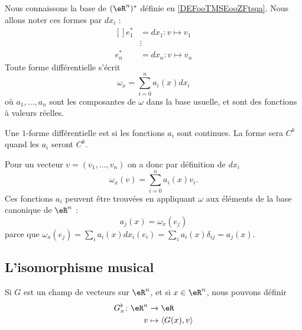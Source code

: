 Nous connaissons la base de \( (\eR^n)^*\) définie en \ref{DEFooTMSEooZFtsqa}. Nous allons noter ces formes par \( dx_i\) :
\begin{equation}        \label{EQooITHKooDzigPY}
	\begin{aligned}[]
		e^*_1 & =dx_1\colon v\mapsto v_1 \\
		      & \vdots                   \\
		e^*_n & =dx_n\colon v\mapsto v_n
	\end{aligned}
\end{equation}
Toute forme différentielle s'écrit
\begin{equation}
	\omega_x = \sum_{i=0}^n a_i(x) d x_i
\end{equation}
où \( a_1,\ldots,a_n\) sont les composantes de \( \omega\) dans la base usuelle, et sont des fonctions à valeurs réelles.

\begin{lemma}		\label{LEMooNSFKooLOKGGy}
	Une \( 1\)-forme différentielle est  si les fonctions \( a_i\) sont continues. La forme sera \( C^k\) quand les \( a_i\) seront \( C^k\).
\end{lemma}

Pour un vecteur \( v = (v_1,\ldots,v_n)\) on a donc par définition de \( d x_i\)
\begin{equation}
	\omega_x (v) = \sum_{i=0}^n a_i(x) v_i.
\end{equation}
Ces fonctions \( a_i\) peuvent être trouvées en appliquant \( \omega\) aux éléments de la base canonique de \( \eR^n\) :
\begin{equation}
	a_j(x)=\omega_x(e_j)
\end{equation}
parce que \( \omega_x(e_j)=\sum_ia_i(x)dx_i(e_i)=\sum_ia_i(x)\delta_{ij}=a_j(x)\).

\subsection{L'isomorphisme musical}

Si \( G\) est un champ de vecteurs sur \( \eR^n\), et si \( x\in\eR^n\), nous pouvons définir
\begin{equation}		\label{EqDefBemol}
	\begin{aligned}[]
		G^{\flat}_x\colon \eR^n & \to \eR                        \\
		v                       & \mapsto \langle G(x), v\rangle
	\end{aligned}
\end{equation}

